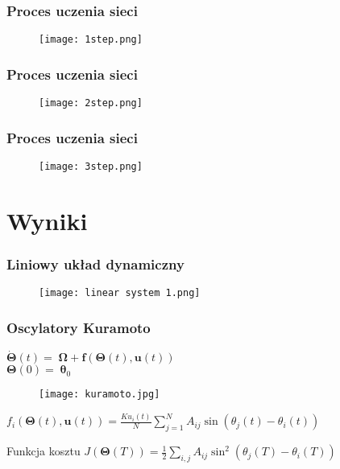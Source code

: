 \documentclass{presentation_fg}
\begin{document}
{
\begin{frame}
	\frametitle{Proces uczenia sieci}
	\begin{figure}
		\texttt{[image: 1step.png]}
	\end{figure}
\end{frame}

\begin{frame}
	\frametitle{Proces uczenia sieci}
	\begin{figure}
		\texttt{[image: 2step.png]}
	\end{figure}
\end{frame}

\begin{frame}
	\frametitle{Proces uczenia sieci}
	\begin{figure}
		\texttt{[image: 3step.png]}
	\end{figure}
\end{frame}

\section{Wyniki}

\begin{frame}
	\frametitle{Liniowy układ dynamiczny}
	\begin{figure}
		\texttt{[image: linear system 1.png]}
	\end{figure}
\end{frame}
}

\begin{frame}
	\frametitle{Oscylatory Kuramoto}
	\begin{minipage}{0.3\linewidth}
		${\dot{{{\boldsymbol{\Theta}}}}}(t)=	\; {{{\boldsymbol{\Omega }}}}+{{{\boldsymbol{f}}}}({{{\boldsymbol{\Theta }}}}(t),{{{\boldsymbol{u}}}}(t))$
		\\
		${{{\boldsymbol{\Theta }}}}(0)=	\; {{{{\boldsymbol{\theta }}}}}_{0}$
	\end{minipage}
	\pause
	\begin{minipage}{0.45\linewidth}
		\begin{figure}
			\texttt{[image: kuramoto.jpg]}
		\end{figure}		
	\end{minipage}
	\pause
	${f}_{i}({{{\boldsymbol{\Theta }}}}(t),{{{\boldsymbol{u}}}}(t))=\frac{K{u}_{i}(t)}{N}\mathop{\sum }\limits_{j=1}^{N}{A}_{ij}\sin ({\theta }_{j}(t)-{\theta }_{i}(t))$
	\pause
	\begin{block}{Funkcja kosztu}
		${J}({{{\boldsymbol{\Theta }}}}(T))=\frac{1}{2}\mathop{\sum}\limits_{i,j}{A}_{ij}{\sin }^{2}({\theta }_{j}(T)-{\theta }_{i}(T))$
	\end{block}
\end{frame}
\end{document}
